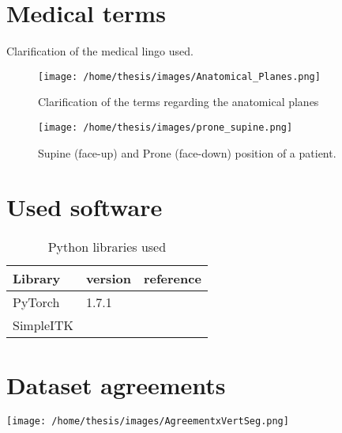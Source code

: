 \documentclass[
    a4paper, %
    9pt, %
    oneside, 
    onecolumn, %
    openany, %
    ]{memoir}
\begin{document}
\chapter{Medical terms}

Clarification of the medical lingo used.

\begin{SCfigure}[][htb]
  \centering
  \texttt{[image: /home/thesis/images/Anatomical\_Planes.png]}
  \caption{Clarification of the terms regarding the anatomical planes
  }
\end{SCfigure}

\begin{SCfigure}[][htb]
  \centering
  \texttt{[image: /home/thesis/images/prone\_supine.png]}
  \caption{Supine (face-up) and Prone (face-down) position of a patient.}
\end{SCfigure}

\chapter{Used software}



\begin{SCtable}[\sidecaptionrelwidth][h]
 
  \begin{tabular}{ p{6cm} l l } 
   \hline
   \hline
   Library & version & reference  \\
   \hline 
   PyTorch & 1.7.1 &  \\ 
   SimpleITK &  &  \\ 
   \hline
   \hline
  \end{tabular}
  \caption{Python libraries used}

\end{SCtable}
\chapter{Dataset agreements}

\texttt{[image: /home/thesis/images/AgreementxVertSeg.png]}

\printbibliography
\end{document}
